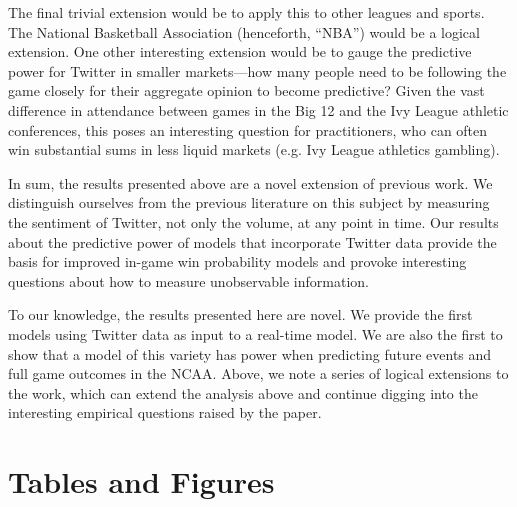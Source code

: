 \documentclass[12pt]{article}
\begin{document}
\begin{doublespacing}
The final trivial extension would be to apply this to other leagues and sports. The National Basketball Association (henceforth, ``NBA'') would be a logical extension. One other interesting extension would be to gauge the predictive power for Twitter in smaller markets---how many people need to be following the game closely for their aggregate opinion to become predictive? Given the vast difference in attendance between games in the Big 12 and the Ivy League athletic conferences, this poses an interesting question for practitioners, who can often win substantial sums in less liquid markets (e.g. Ivy League athletics gambling).    

In sum, the results presented above are a novel extension of previous work. We distinguish ourselves from the previous literature on this subject by measuring the sentiment of Twitter, not only the volume, at any point in time. Our results about the predictive power of models that incorporate Twitter data provide the basis for improved in-game win probability models and provoke interesting questions about how to measure unobservable information. 

To our knowledge, the results presented here are novel. We provide the first models using Twitter data as input to a real-time model. We are also the first to show that a model of this variety has power when predicting future events and full game outcomes in the NCAA. Above, we note a series of logical extensions to the work, which can extend the analysis above and continue digging into the interesting empirical questions raised by the paper. 

\section{Tables and Figures}


\end{doublespacing}
\end{document}
